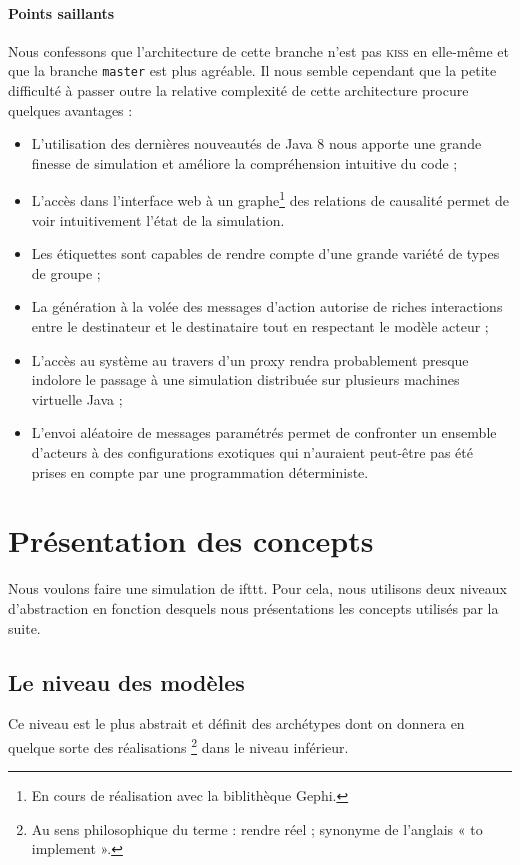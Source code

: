 \documentclass[11pt]{article}
\begin{document}
\paragraph{Points saillants} Nous confessons que l'architecture de cette branche n'est pas \textsc{kiss} en elle-même et que la branche \texttt{master} est plus agréable. Il nous semble cependant que la petite difficulté à passer outre la relative complexité de cette architecture procure quelques avantages :
\begin{itemize}
\item L'utilisation des dernières nouveautés de Java 8 nous apporte une grande finesse de simulation et améliore la compréhension intuitive du code ;
\item L'accès dans l'interface web à un graphe\footnote{En cours de réalisation avec la biblithèque Gephi.} des relations de causalité permet de voir intuitivement l'état de la simulation.
\item Les étiquettes sont capables de rendre compte d'une grande variété de types de groupe ;
\item La génération à la volée des messages d'action autorise de riches interactions entre le destinateur et le destinataire tout en respectant le modèle acteur ;
\item L'accès au système au travers d'un proxy rendra probablement presque indolore le passage à une simulation distribuée sur plusieurs machines virtuelle Java ;
\item L'envoi aléatoire de messages paramétrés permet de confronter un ensemble d'acteurs à des configurations exotiques qui n'auraient peut-être pas été prises en compte par une programmation déterministe.
\end{itemize}

\section{Présentation des concepts}

Nous voulons faire une simulation de ifttt. Pour cela, nous utilisons deux niveaux d'abstraction en fonction desquels nous présentations les concepts utilisés par la suite.

\subsection{Le niveau des modèles} Ce niveau est le plus abstrait et définit des archétypes dont on donnera en quelque sorte des réalisations \footnote{Au sens philosophique du terme : rendre réel ; synonyme de l'anglais « to implement ».} dans le niveau inférieur.
\end{document}
